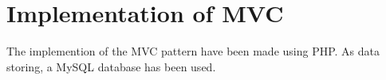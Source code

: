 \section{Implementation of MVC}
The implemention of the MVC pattern have been made using PHP. As data storing, a MySQL database has been used. 
